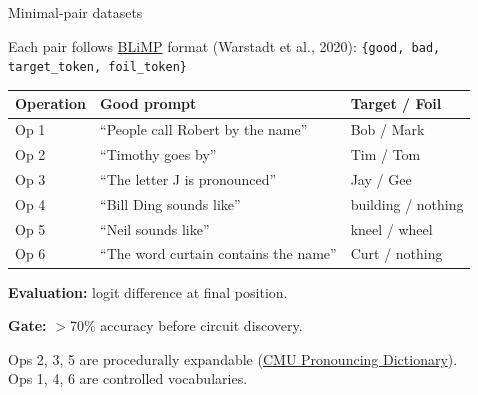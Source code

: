 \documentclass[10pt,aspectratio=169]{beamer}
\begin{document}
\begin{frame}
\begin{center}
\vfill
  {\setlength{\fboxrule}{2.5pt}}
\vfill
\end{center}
\end{frame}

\begin{frame}{Minimal-pair datasets}
\hypertarget{sl:datasets}{}

Each pair follows \href{https://arxiv.org/abs/1912.00582}{BLiMP} format {\scriptsize(Warstadt et al., 2020)}: \texttt{\{good, bad, target\_token, foil\_token\}}

\vspace{0.5em}
\begin{center}
\footnotesize
\begin{tabular}{lll}
\toprule
\textbf{Operation} & \textbf{Good prompt} & \textbf{Target / Foil} \\
\midrule
Op 1 & ``People call Robert by the name'' & Bob / Mark \\
Op 2 & ``Timothy goes by'' & Tim / Tom \\
Op 3 & ``The letter J is pronounced'' & Jay / Gee \\
Op 4 & ``Bill Ding sounds like'' & building / nothing \\
Op 5 & ``Neil sounds like'' & kneel / wheel \\
Op 6 & ``The word curtain contains the name'' & Curt / nothing \\
\bottomrule
\end{tabular}
\end{center}

\vspace{0.5em}
\textbf{Evaluation:} logit difference at final position.

\textbf{Gate:} $>$70\% accuracy before circuit discovery.

\vspace{0.5em}
Ops 2, 3, 5 are procedurally expandable (\href{http://www.speech.cs.cmu.edu/cgi-bin/cmudict}{CMU Pronouncing Dictionary}).\\
Ops 1, 4, 6 are controlled vocabularies.
\end{frame}
\end{document}
